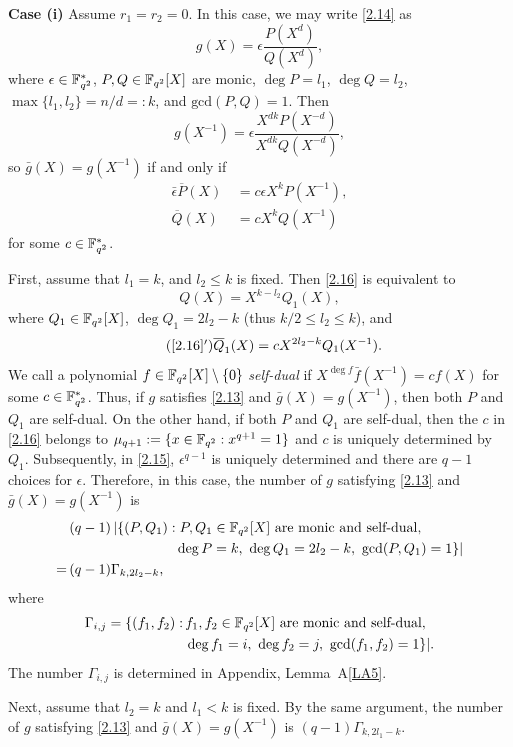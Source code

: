 \documentclass{amsart}
\numberwithin{equation}{section}
\theoremstyle{definition}
\newcommand{\f}{\Bbb F}
\begin{document}
\medskip
{\bf Case (i)} Assume $r_1=r_2=0$. In this case, we may write \eqref{2.14} as
\[
g(X)=\epsilon\frac{P(X^d)}{Q(X^d)},
\]
where $\epsilon\in\f_{q^2}^*$, $P,Q\in\f_{q^2}[X]$ are monic, $\deg P=l_1$, $\deg Q=l_2$, $\max\{l_1,l_2\}=n/d=:k$, and $\text{gcd}(P,Q)=1$. Then
\[
g(X^{-1})=\epsilon\frac{X^{dk}P(X^{-d})}{X^{dk}Q(X^{-d})},
\]
so $\bar g(X)=g(X^{-1})$ if and only if
\begin{align}\label{2.15}
\bar\epsilon\overline P(X)\,&=c\epsilon X^k P(X^{-1}),\\ \label{2.16}
\overline Q(X)\,&=cX^k Q(X^{-1})
\end{align}
for some $c\in\f_{q^2}^*$.

First, assume that $l_1=k$, and $l_2\le k$ is fixed. Then \eqref{2.16} is equivalent to
\[
Q(X)=X^{k-l_2}Q_1(X),
\]
where $Q_1\in\f_{q^2}[X]$, $\deg Q_1=2l_2-k$ (thus $k/2\le l_2\le k$), and
\begin{equation}\tag{\ref{2.16}$'$}\label{2.16'}
\overline Q_1(X)=cX^{2l_2-k}Q_1(X^{-1}).
\end{equation}
We call a polynomial $f\in\f_{q^2}[X]\setminus\{0\}$ {\em self-dual} if $X^{\deg f}\bar f(X^{-1})=cf(X)$ for some $c\in\f_{q^2}^*$. 
Thus, if $g$ satisfies \eqref{2.13} and $\bar g(X)=g(X^{-1})$, then both $P$ and $Q_1$ are self-dual. On the other hand, if both $P$ and $Q_1$ are self-dual, then the $c$ in \eqref{2.16} belongs to $\mu_{q+1}:=\{x\in\f_{q^2}:x^{q+1}=1\}$ and $c$ is uniquely determined by $Q_1$. Subsequently, in \eqref{2.15}, $\epsilon^{q-1}$ is uniquely determined and there are $q-1$ choices for $\epsilon$. Therefore, in this case, the number of $g$ satisfying \eqref{2.13} and $\bar g(X)=g(X^{-1})$ is 
\begin{align}\label{2.17}
&(q-1)\,|\{(P,Q_1): P,Q_1\in\f_{q^2}[X]\ \text{are monic and self-dual},\\
&\kern7.6em \deg P=k,\ \deg Q_1=2l_2-k,\ \text{gcd}(P,Q_1)=1\}|\cr
=\,&(q-1)\Gamma_{k,2l_2-k},
\nonumber
\end{align}
where
\begin{align*}
\Gamma_{i,j}=\{(f_1,f_2):\,& f_1,f_2\in\f_{q^2}[X]\ \text{are monic and self-dual},\\
&\deg f_1=i,\ \deg f_2=j,\ \text{gcd}(f_1,f_2)=1\}|.
\end{align*}
The number $\Gamma_{i,j}$ is determined in Appendix, Lemma~A\ref{LA5}.

Next, assume that $l_2=k$ and $l_1<k$ is fixed. By the same argument, the number of $g$ satisfying \eqref{2.13} and $\bar g(X)=g(X^{-1})$ is $(q-1)\Gamma_{k,2l_1-k}$.
\end{document}
